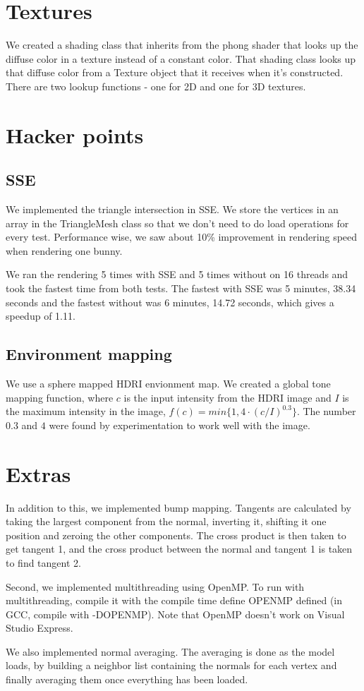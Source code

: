 \documentclass{article} %
\begin{document}
\section{Textures}
We created a shading class that inherits from the phong shader that looks up the diffuse color in a texture instead of a constant color. That shading class looks up that diffuse color from a Texture object that it receives when it's constructed. There are two lookup functions - one for 2D and one for 3D textures.

\section{Hacker points}
\subsection{SSE}
We implemented the triangle intersection in SSE. We store the vertices in an array in the TriangleMesh class so that we don't need to do load operations for every test. Performance wise, we saw about 10\% improvement in rendering speed when rendering one bunny. 

We ran the rendering 5 times with SSE and 5 times without on 16 threads and took the fastest time from both tests. The fastest with SSE was 5 minutes, 38.34 seconds and the fastest without was 6 minutes, 14.72 seconds, which gives a speedup of 1.11.

\subsection{Environment mapping}
We use a sphere mapped HDRI envionment map. We created a global tone mapping function, where $c$ is the input intensity from the HDRI image and $I$ is the maximum intensity in the image, $f(c)=min\{1, 4\cdot(c/I)^{0.3}\}$. The number $0.3$ and $4$ were found by experimentation to work well with the image.

\section{Extras}
In addition to this, we implemented bump mapping. Tangents are calculated by taking the largest component from the normal, inverting it, shifting it one position and zeroing the other components. The cross product is then taken to get tangent 1, and the cross product between the normal and tangent 1 is taken to find tangent 2.

Second, we implemented multithreading using OpenMP. To run with multithreading, compile it with the compile time define OPENMP defined (in GCC, compile with -DOPENMP). Note that OpenMP doesn't work on Visual Studio Express.

We also implemented normal averaging. The averaging is done as the model loads, by building a neighbor list containing the normals for each vertex and finally averaging them once everything has been loaded.
\end{document}
